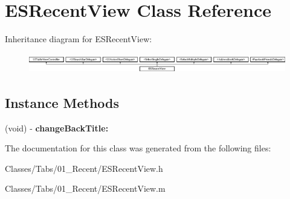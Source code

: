 \hypertarget{interface_e_s_recent_view}{}\section{E\+S\+Recent\+View Class Reference}
\label{interface_e_s_recent_view}
Inheritance diagram for E\+S\+Recent\+View\+:\begin{figure}[H]
\begin{center}
\leavevmode
\includegraphics[height=0.874317cm]{interface_e_s_recent_view}
\end{center}
\end{figure}
\subsection*{Instance Methods}
\begin{DoxyCompactItemize}
\item 
\hypertarget{interface_e_s_recent_view_ae0945c271700235e7b4cac5cde96f46b}{}(void) -\/ {\bfseries change\+Back\+Title\+:}\label{interface_e_s_recent_view_ae0945c271700235e7b4cac5cde96f46b}

\end{DoxyCompactItemize}


The documentation for this class was generated from the following files\+:\begin{DoxyCompactItemize}
\item 
Classes/\+Tabs/01\+\_\+\+Recent/E\+S\+Recent\+View.\+h\item 
Classes/\+Tabs/01\+\_\+\+Recent/E\+S\+Recent\+View.\+m\end{DoxyCompactItemize}
